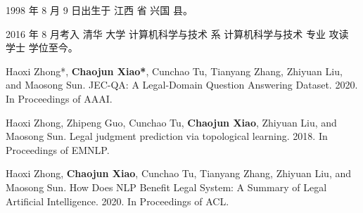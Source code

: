 
\begin{resume}


  1998 年 8 月 9 日出生于 江西 省 兴国 县。

  2016 年 8 月考入 清华 大学 计算机科学与技术 系 计算机科学与技术 专业 攻读 学士 学位至今。


  \begin{publications}
    \item Haoxi Zhong*, \textbf{Chaojun Xiao*}, Cunchao Tu, Tianyang Zhang, Zhiyuan Liu, and Maosong Sun. JEC-QA: A Legal-Domain Question Answering Dataset. 2020. In Proceedings of AAAI.
    \item Haoxi Zhong, Zhipeng Guo, Cunchao Tu, \textbf{Chaojun Xiao}, Zhiyuan Liu, and Maosong Sun. Legal judgment prediction via topological learning. 2018. In Proceedings of EMNLP.
  \end{publications}

  \begin{publications}[before=\publicationskip,after=\publicationskip]
    \item Haoxi Zhong, \textbf{Chaojun Xiao}, Cunchao Tu, Tianyang Zhang, Zhiyuan Liu, and Maosong Sun. How Does NLP Benefit Legal System: A Summary of Legal Artificial Intelligence. 2020. In Proceedings of ACL.
  \end{publications}


\end{resume}
